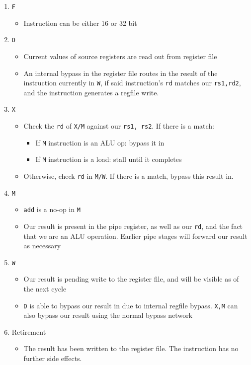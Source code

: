 \documentclass{article}
\begin{document}
\begin{enumerate}
	\item \texttt{F}
	\begin{itemize}
		\item Instruction can be either 16 or 32 bit
	\end{itemize}
	\item \texttt{D}
	\begin{itemize}
		\item Current values of source registers are read out from register file
		\item An internal bypass in the register file routes in the result of the instruction currently in \texttt{W}, if said instruction's \texttt{rd} matches our \texttt{rs1,rd2}, and the instruction generates a regfile write.
	\end{itemize}
	\item \texttt{X}
	\begin{itemize}
		\item Check the \texttt{rd} of \texttt{X/M} against our \texttt{rs1, rs2}. If there is a match:
		\begin{itemize}
			\item If \texttt{M} instruction is an ALU op: bypass it in
			\item If \texttt{M} instruction is a load: stall until it completes
		\end{itemize}
		\item Otherwise, check \texttt{rd} in \texttt{M/W}. If there is a match, bypass this result in.
	\end{itemize}
	\item \texttt{M}
	\begin{itemize}
		\item \texttt{add} is a no-op in \texttt{M}
		\item Our result is present in the pipe register, as well as our \texttt{rd}, and the fact that we are an ALU operation. Earlier pipe stages will forward our result as necessary
	\end{itemize}
	\item \texttt{W}
	\begin{itemize}
		\item Our result is pending write to the register file, and will be visible as of the next cycle
		\item \texttt{D} is able to bypass our result in due to internal regfile bypass. \texttt{X,M} can also bypass our result using the normal bypass network
	\end{itemize}
	\item Retirement
	\begin{itemize}
		\item The result has been written to the register file. The instruction has no further side effects.
	\end{itemize}
\end{enumerate} 
\end{document}

